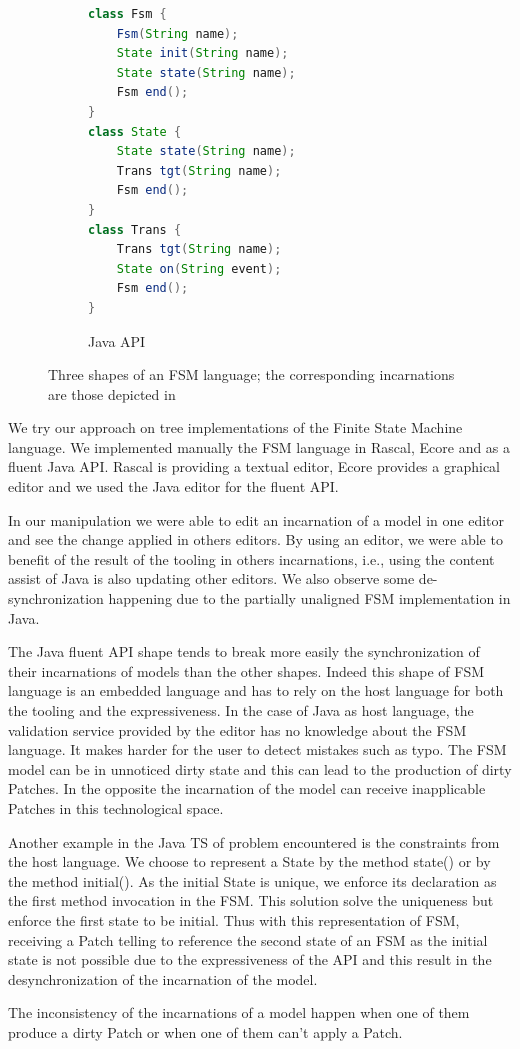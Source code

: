 \begin{figure}[bt]
	\enskip
	\vrule
	\enskip
	\begin{subfigure}[b]{.35\columnwidth}
		\begin{lstlisting}[label=lst:fsm-api, language=Java, numbers=none, xleftmargin=0pt, tabsize=1]
class Fsm {
	Fsm(String name);
	State init(String name);
	State state(String name);
	Fsm end();
}
class State {
	State state(String name);
	Trans tgt(String name);
	Fsm end();
}
class Trans {
	Trans tgt(String name);
	State on(String event);
	Fsm end();
}
		\end{lstlisting}
		\caption{Java API}
	\end{subfigure}
	\caption{Three shapes of an FSM language; the corresponding incarnations are those depicted in }
\end{figure}


We try our approach on tree implementations of the Finite State Machine language.
We implemented manually the FSM language in Rascal, Ecore and as a fluent Java API.
Rascal is providing a textual editor, Ecore provides a graphical editor and we used the Java editor for the fluent API.

In our manipulation we were able to edit an incarnation of a model in one editor and see the change applied in others editors.
By using an editor, we were able to benefit of the result of the tooling in others incarnations, i.e., using the content assist of Java is also updating other editors.
We also observe some de-synchronization happening due to the partially unaligned FSM implementation in Java.

The Java fluent API shape tends to break more easily the synchronization of their incarnations of models than the other shapes.
Indeed this shape of FSM language is an embedded language and has to rely on the host language for both the tooling and the expressiveness.
In the case of Java as host language, the validation service provided by the editor has no knowledge about the FSM language.
It makes harder for the user to detect mistakes such as typo. The FSM model can be in unnoticed dirty state and this can lead to the production of dirty Patches.
In the opposite the incarnation of the model can receive inapplicable Patches in this technological space.

Another example in the Java TS of problem encountered is the constraints from the host language.
We choose to represent a State by the method state() or by the method initial().
As the initial State is unique, we enforce its declaration as the first method invocation in the FSM.
This solution solve the uniqueness but enforce the first state to be initial.
Thus with this representation of FSM, receiving a Patch telling to reference the second state of an FSM as the initial state is not possible due to the expressiveness of the API and this result in the desynchronization of the incarnation of the model.

The inconsistency of the incarnations of a model happen when one of them produce a dirty Patch or when one of them can't apply a Patch.
